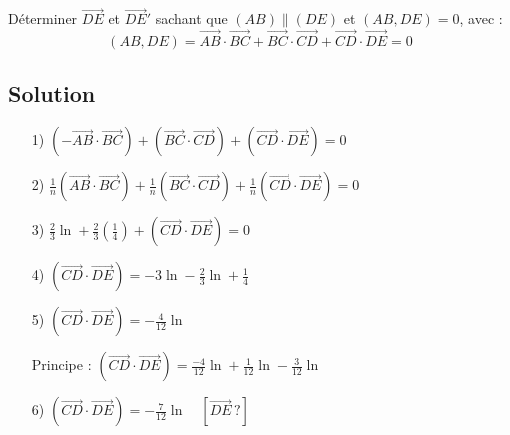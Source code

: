 \documentclass{article}
\begin{document}
\begin{center}
\end{center}
Déterminer \(\overrightarrow{DE}\) et \(\overrightarrow{DE}'\) sachant que \((AB) \parallel (DE)\) et \((AB, DE) = 0\), avec :
\[
(AB, DE) = \overrightarrow{AB} \cdot \overrightarrow{BC} + \overrightarrow{BC} \cdot \overrightarrow{CD} + \overrightarrow{CD} \cdot \overrightarrow{DE} = 0
\]

\subsection*{Solution}
\begin{itemize}
    \item[1)] \((-\overrightarrow{AB} \cdot \overrightarrow{BC}) + (\overrightarrow{BC} \cdot \overrightarrow{CD}) + (\overrightarrow{CD} \cdot \overrightarrow{DE}) = 0\)
    
    \item[2)] \(\frac{1}{n} (\overrightarrow{AB} \cdot \overrightarrow{BC}) + \frac{1}{n} (\overrightarrow{BC} \cdot \overrightarrow{CD}) + \frac{1}{n} (\overrightarrow{CD} \cdot \overrightarrow{DE}) = 0\)
    
    \item[3)] \(\frac{2}{3} \ln + \frac{2}{3} \left(\frac{1}{4}\right) + (\overrightarrow{CD} \cdot \overrightarrow{DE}) = 0\)
    
    \item[4)] \((\overrightarrow{CD} \cdot \overrightarrow{DE}) = -3 \ln - \frac{2}{3} \ln + \frac{1}{4}\)
    
    \item[5)] \((\overrightarrow{CD} \cdot \overrightarrow{DE}) = -\frac{4}{12} \ln\)
    
    \item[Principe :] \((\overrightarrow{CD} \cdot \overrightarrow{DE}) = \frac{-4}{12} \ln + \frac{1}{12} \ln - \frac{3}{12} \ln\)
    
    \item[6)] \((\overrightarrow{CD} \cdot \overrightarrow{DE}) = -\frac{7}{12} \ln \quad [\overrightarrow{DE} \, ?]\)
\end{itemize}
\end{document}
